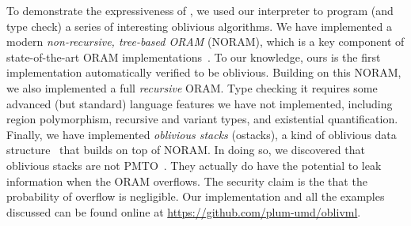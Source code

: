 To demonstrate the expressiveness of \obliv, we used our interpreter to
program (and type check) a series of interesting oblivious
algorithms. We have implemented a modern \emph{non-recursive, tree-based ORAM} (NORAM), which
is a key component of state-of-the-art ORAM implementations~\cite{asiacrypt11,pathoram,circuitoram}.
To our knowledge, ours is the first implementation automatically verified to
be oblivious. Building on this NORAM, we also implemented a full \emph{recursive} ORAM.
Type checking it requires some advanced (but standard) language features we
have not implemented, including region polymorphism, recursive and variant
types, and existential quantification. Finally, we have implemented \emph{oblivious stacks}
(ostacks), a kind of oblivious data structure~\cite{ods} that builds on top of NORAM.
In doing so, we discovered that oblivious stacks are not PMTO~\cite{sweet20odsnotpmto}.
They actually do have the potential to leak information when the ORAM overflows. The security claim is
the that the probability of overflow is negligible. Our implementation and all the examples discussed can be
found online at \url{https://github.com/plum-umd/oblivml}.
